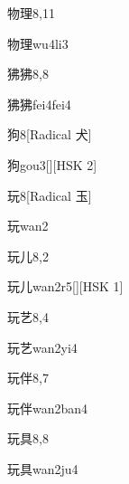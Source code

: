 \begin{entry}{物理}{8,11}
  \begin{phonetics}{物理}{wu4li3}
  \end{phonetics}
\end{entry}

\begin{entry}{狒狒}{8,8}
  \begin{phonetics}{狒狒}{fei4fei4}
  \end{phonetics}
\end{entry}

\begin{entry}{狗}{8}[Radical 犬]
  \begin{phonetics}{狗}{gou3}[][HSK 2]
  \end{phonetics}
\end{entry}

\begin{entry}{玩}{8}[Radical 玉]
  \begin{phonetics}{玩}{wan2}
  \end{phonetics}
\end{entry}

\begin{entry}{玩儿}{8,2}
  \begin{phonetics}{玩儿}{wan2r5}[][HSK 1]
  \end{phonetics}
\end{entry}

\begin{entry}{玩艺}{8,4}
  \begin{phonetics}{玩艺}{wan2yi4}
  \end{phonetics}
\end{entry}

\begin{entry}{玩伴}{8,7}
  \begin{phonetics}{玩伴}{wan2ban4}
  \end{phonetics}
\end{entry}

\begin{entry}{玩具}{8,8}
  \begin{phonetics}{玩具}{wan2ju4}
  \end{phonetics}
\end{entry}

